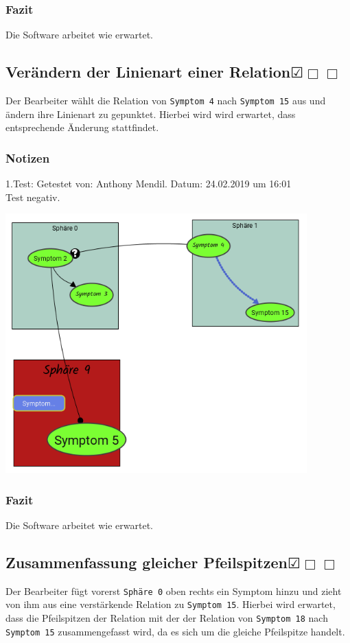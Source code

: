 \documentclass{scrartcl}
\newcommand{\subsectiont}[2]{\subsection[#1]{#1{\normalsize\normalfont #2}}}
\newcommand{\leer}{$\Box$}
\newcommand{\ok}{$\CheckedBox$}
\begin{document}
\subsubsection{Fazit}
Die Software arbeitet wie erwartet.

\subsectiont{Verändern der Linienart einer Relation}{\dotfill\ok\leer\leer}
Der Bearbeiter wählt die Relation von \texttt{Symptom 4} nach \texttt{Symptom 15} aus und ändern ihre Linienart zu gepunktet. Hierbei wird wird erwartet, dass entsprechende Änderung stattfindet. 
\subsubsection{Notizen}
1.Test: Getestet von: Anthony Mendil. Datum: 24.02.2019 um 16:01 \\
Test negativ.
\begin{center}
\includegraphics[height=10cm]{3_34.PNG}
\end{center}
\subsubsection{Fazit}
Die Software arbeitet wie erwartet.

\subsectiont{Zusammenfassung gleicher Pfeilspitzen}{\dotfill\ok\leer\leer}
Der Bearbeiter fügt vorerst \texttt{Sphäre 0} oben rechts ein Symptom hinzu und zieht von ihm aus eine verstärkende Relation zu \texttt{Symptom 15}. Hierbei wird erwartet, dass die Pfeilspitzen der Relation mit der der Relation von \texttt{Symptom 18} nach \texttt{Symptom 15} zusammengefasst wird, da es sich um die gleiche Pfeilspitze handelt.
\end{document}
